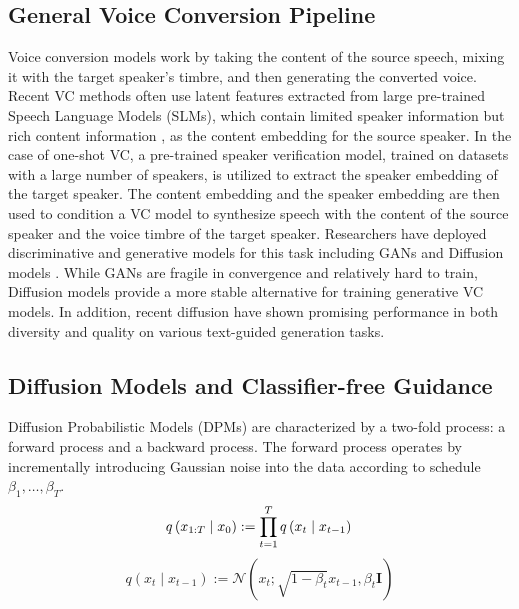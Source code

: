 \documentclass{Interspeech2024}
\begin{document}
\subsection{General Voice Conversion Pipeline} 
Voice conversion models work by taking the content of the source speech, mixing it with the target speaker's timbre, and then generating the converted voice. Recent VC methods often use latent features extracted from large pre-trained Speech Language Models (SLMs), which contain limited speaker information but rich content information \cite{qian2022contentvec}, as the content embedding for the source speaker. In the case of one-shot VC, a pre-trained speaker verification model, trained on datasets with a large number of speakers, is utilized to extract the speaker embedding of the target speaker. The content embedding and the speaker embedding are then used to condition a VC model to synthesize speech with the content of the source speaker and the voice timbre of the target speaker. Researchers have deployed discriminative \cite{qian2019autovc} and generative models for this task including GANs \cite{hsu2017voice, kameoka2018stargan} and Diffusion models \cite{popov2021diffusion, li2023freevc}. While GANs \cite{saxena2021generative} are fragile in convergence and relatively hard to train, Diffusion \cite{yang2023diffusion} models provide a more stable alternative for training generative VC models. In addition, recent diffusion have shown promising performance in both diversity and quality on various text-guided generation tasks. 

\subsection{Diffusion Models and Classifier-free Guidance}

Diffusion Probabilistic Models (DPMs) are characterized by a two-fold process: a forward process and a backward process. The forward process operates by incrementally introducing Gaussian noise into the data according to schedule \(\beta_{1}, \ldots, \beta_{T}\). 
\begin{equation}
q\left(x_{1: T} \mid x_{0}\right):=\prod_{t=1}^{T} q\left(x_{t} \mid x_{t-1}\right) \\
\end{equation}
\begin{equation}
q\left(x_{t} \mid x_{t-1}\right):=\mathcal{N}\left(x_{t} ; \sqrt{1-\beta_{t}} x_{t-1}, \beta_{t} \mathbf{I}\right)
\end{equation}
\end{document}
